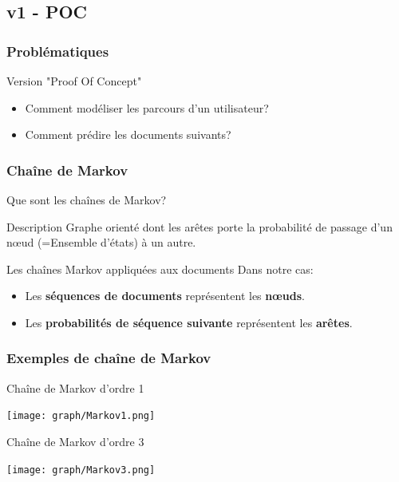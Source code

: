 \documentclass{beamer}
\begin{document}
        \subsection{v1 - POC}
            \begin{frame}
                \frametitle{Problématiques}
                Version "Proof Of Concept"
                \begin{itemize}
                    \pause
                    \item Comment modéliser les parcours d'un utilisateur?
                    \pause
                    \item Comment prédire les documents suivants?
                \end{itemize}
            \end{frame}
            \begin{frame}
                \frametitle{Chaîne de Markov}
                Que sont les chaînes de Markov?
                \pause
                \begin{block}{Description}
                    Graphe orienté dont les arêtes porte la probabilité de passage d'un nœud (=Ensemble d'états) à un autre.
                \end{block}
                \pause
                \begin{block}{Les chaînes Markov appliquées aux documents}
                    Dans notre cas:
                    \begin{itemize}
                        \item Les \textbf{séquences de documents} représentent les \textbf{nœuds}.
                        \item Les \textbf{probabilités de séquence suivante} représentent les \textbf{arêtes}.
                    \end{itemize}
                \end{block}
            \end{frame}
            \begin{frame}
                \frametitle{Exemples de chaîne de Markov}
                \pause
                \begin{exampleblock}{Chaîne de Markov d'ordre 1}
                    \begin{center}
                        \texttt{[image: graph/Markov1.png]}
                    \end{center}
                \end{exampleblock}
                \pause
                \begin{exampleblock}{Chaîne de Markov d'ordre 3}
                    \begin{center}
                        \texttt{[image: graph/Markov3.png]}
                    \end{center}
                \end{exampleblock}
            \end{frame}
\end{document}
